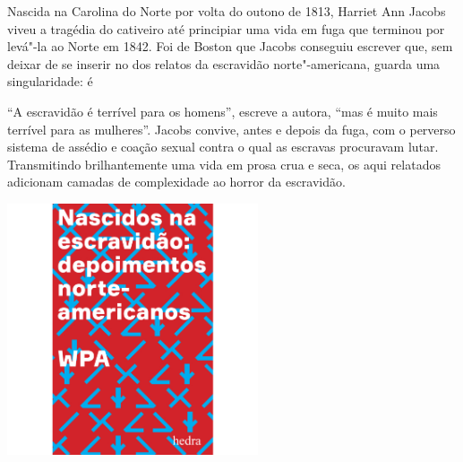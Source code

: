 \noindent{}Nascida na Carolina do Norte por volta do outono de 1813, Harriet Ann Jacobs viveu a tragédia do cativeiro até principiar uma vida em fuga que terminou por levá"-la ao Norte em 1842. Foi de Boston que Jacobs conseguiu escrever {} que, sem deixar de se inserir no {} dos relatos da escravidão norte"-americana, guarda uma singularidade: é 

“A escravidão é terrível para os homens”, escreve a autora, “mas é muito mais terrível para as mulheres”. Jacobs convive, antes e depois da fuga, com o perverso sistema de assédio e coação sexual contra o qual as escravas procuravam lutar. Transmitindo brilhantemente uma vida em prosa crua e seca, os {} aqui relatados adicionam camadas de complexidade ao horror da escravidão.


\vfill

\hspace*{-.4cm}\begin{minipage}[c]{.5\linewidth}
\small{
{}}
\end{minipage}


\pagebreak

\begin{center}
\hspace*{-3.6cm}
\hspace*{3.1cm}\includegraphics[width=74mm]{./grid/wpa.jpg}
\end{center}

